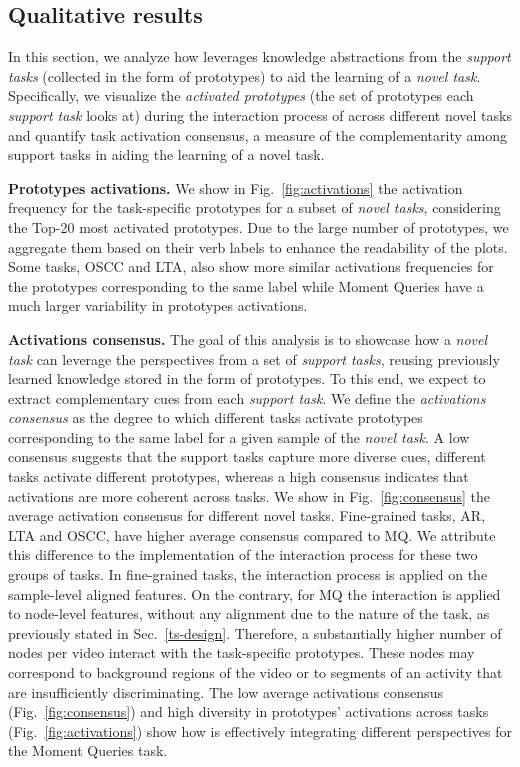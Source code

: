 \subsection{Qualitative results}
\label{sec:exp_qualitative}
In this section, we analyze how \ours leverages knowledge abstractions from the \emph{support tasks} (collected in the form of prototypes) to aid the learning of a \emph{novel task}.
Specifically, we visualize the \emph{activated prototypes} (\ie the set of prototypes each \emph{support task} looks at) during the interaction process of \ours across different novel tasks and quantify task activation consensus, a measure of the complementarity among support tasks in aiding the learning of a novel task.

\smallskip
\smallskip
\noindent\textbf{Prototypes activations.}
We show in Fig.~\ref{fig:activations} the activation frequency for the task-specific prototypes for a subset of \emph{novel tasks}, considering the Top-20 most activated prototypes.
Due to the large number of prototypes, we aggregate them based on their verb labels to enhance the readability of the plots.
Some tasks, \ie OSCC and LTA, also show more similar activations frequencies for the prototypes corresponding to the same label while Moment Queries have a much larger variability in prototypes activations.

\smallskip
\smallskip
\noindent\textbf{Activations consensus.}
The goal of this analysis is to showcase how a \emph{novel task} can leverage the perspectives from a set of \emph{support tasks}, reusing previously learned knowledge stored in the form of prototypes.
To this end, we expect \ours to extract complementary cues from each \emph{support task}.
We define the \emph{activations consensus} as the degree to which different tasks activate prototypes corresponding to the same label for a given sample of the \emph{novel task}.
A low consensus suggests that the support tasks capture more diverse cues, \ie different tasks activate different prototypes, whereas a high consensus indicates that activations are more coherent across tasks.
We show in Fig.~\ref{fig:consensus} the average activation consensus for different novel tasks.
Fine-grained tasks, \eg AR, LTA and OSCC, have higher average consensus compared to MQ.
We attribute this difference to the implementation of the interaction process for these two groups of tasks.
In fine-grained tasks, the interaction process is applied on the sample-level aligned features. On the contrary, for MQ the interaction is applied to node-level features, without any alignment due to the nature of the task, as previously stated in Sec.~\ref{ts-design}.
%
Therefore, a substantially higher number of nodes per video interact with the task-specific prototypes.
These nodes may correspond to background regions of the video or to segments of an activity that are insufficiently discriminating.
The low average activations consensus (Fig.~\ref{fig:consensus}) and high diversity in prototypes' activations across tasks (Fig.~\ref{fig:activations}) show how \ours is effectively integrating different perspectives for the Moment Queries task.


